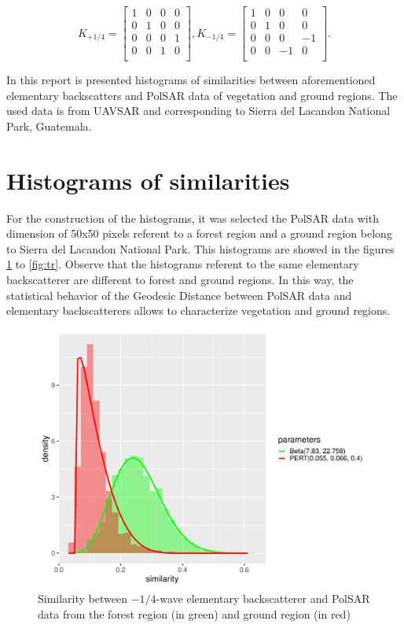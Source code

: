 \documentclass[conference]{IEEEtran}
\begin{document}
\[K_{+1/4}=
\begin{bmatrix}
1 & 0 & 0 & 0\\
0 & 1 & 0 & 0\\
0 & 0 & 0 & 1\\
0 & 0 & 1 & 0\\
\end{bmatrix},
K_{-1/4}=
\begin{bmatrix}
1 & 0 & 0 & 0\\
0 & 1 & 0 & 0\\
0 & 0 & 0 & -1\\
0 & 0 & -1 & 0\\
\end{bmatrix}
.\]

In this report is presented histograms of similarities between aforementioned elementary backscatters and PolSAR data of vegetation and ground regions. 
The used data is from UAVSAR and corresponding to Sierra  del  Lacandon  National  Park,  Guatemala. 

\section{Histograms of similarities}

For the construction of the histograms, it was selected the PolSAR data with dimension of 50x50 pixels referent to a forest region and a ground region belong to Sierra  del  Lacandon  National  Park. This histograms are showed in the figures \ref{fig:wvn} to \ref{fig:tr}. Observe that the histograms referent to the same elementary backscatterer are different to forest and ground regions. In this way, the statistical behavior of the Geodesic Distance between PolSAR data and elementary backscatterers allows to characterize vegetation and ground regions.

\begin{figure}[!ht]
    \vspace{.1\linewidth}
    \centering
    \includegraphics[width = .9\linewidth, height = .7\linewidth]{../../../Figures/paper_19_05/wvn.pdf}
    \caption{Similarity between $-1/4$-wave elementary backscatterer and PolSAR data from the forest region (in green) and ground region (in red) }
    \label{fig:wvn}
\end{figure}
\end{document}
